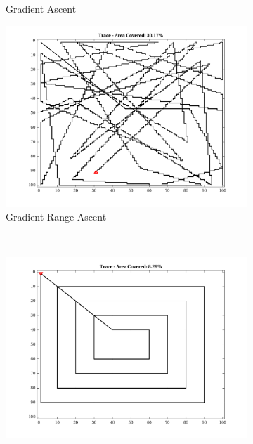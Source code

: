 \begin{figure}[htb!]
\begin{subfigure}[t]{0.3333\textwidth}
        \captionsetup{skip=0.20\baselineskip,size=footnotesize}
        \caption{Gradient Ascent}
    \end{subfigure}%
    \begin{subfigure}[t]{0.3333\textwidth}
        \centering
        \includegraphics[width=\linewidth]{figures/hbresults/path_gr_30p_100x100_sf_50_seed_2.png}
        \captionsetup{skip=0.20\baselineskip,size=footnotesize}
        \caption{Gradient Range Ascent}
    \end{subfigure}%
    \\
    \begin{subfigure}[t]{0.3333\textwidth}
        \centering
        \includegraphics[width=\linewidth]{figures/hbresults/path_zz_10p_100x100_sf_50_seed_2.png}

\end{subfigure}
\end{figure}
